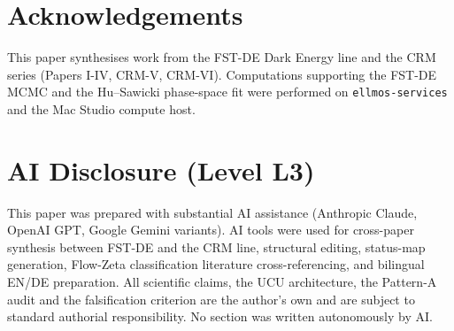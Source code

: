 \documentclass[11pt,a4paper]{article}
\theoremstyle{remark}
\begin{document}
\section*{Acknowledgements}
This paper synthesises work from the FST-DE Dark Energy line and
the CRM series (Papers I-IV, CRM-V, CRM-VI). Computations supporting
the FST-DE MCMC and the Hu--Sawicki phase-space fit were performed
on \texttt{ellmos-services} and the Mac Studio compute host.

\section*{AI Disclosure (Level L3)}
This paper was prepared with substantial AI assistance (Anthropic
Claude, OpenAI GPT, Google Gemini variants). AI tools were used for
cross-paper synthesis between FST-DE and the CRM line, structural
editing, status-map generation, Flow-Zeta classification literature
cross-referencing, and bilingual EN/DE preparation. All scientific
claims, the UCU architecture, the Pattern-A audit and the
falsification criterion are the author's own and are subject to
standard authorial responsibility. No section was written
autonomously by AI.
\end{document}
